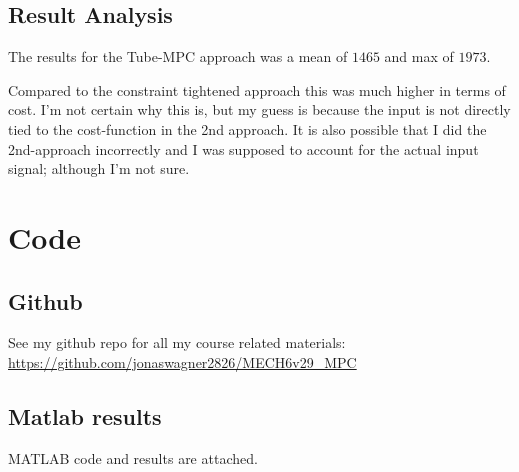\documentclass[]{article}
\begin{document}
\subsection{Result Analysis}
The results for the Tube-MPC approach was a mean of $1465$ and max of $1973$.

Compared to the constraint tightened approach this was much higher in terms of cost.
I'm not certain why this is, but my guess is because the input is not directly tied to the cost-function in the 2nd approach. 
It is also possible that I did the 2nd-approach incorrectly and I was supposed to account for the actual input signal; although I'm not sure.







\newpage
\appendix
\section{Code}
\subsection{Github}
See my github repo for all my course related materials: 
\url{https://github.com/jonaswagner2826/MECH6v29_MPC}

\subsection{Matlab results}
MATLAB code and results are attached.
% 


\end{document}
